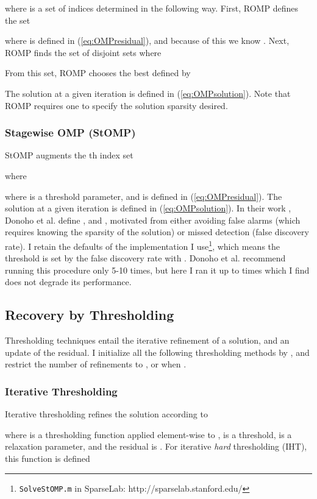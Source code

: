\documentclass[11pt,draftcls,onecolumn]{IEEEtran}
\begin{document}
where  
is a set of indices determined in the following way.
First, ROMP defines the set 

where  is defined in (\ref{eq:OMPresidual}),
and because of this we know .
Next, ROMP finds the set of  disjoint sets  where

From this set, ROMP chooses the best defined by

The solution at a given iteration is defined in (\ref{eq:OMPsolution}).
Note that ROMP requires one to specify the solution sparsity desired.

\subsubsection{Stagewise OMP (StOMP) \cite{Donoho2006}}
StOMP augments the th index set 
 
where

where  is a threshold parameter, 
and  is defined in (\ref{eq:OMPresidual}).
The solution at a given iteration is defined in (\ref{eq:OMPsolution}).
In their work \cite{Donoho2006}, Donoho et al. define , and , 
motivated from either avoiding false alarms (which requires knowing the sparsity of the solution) 
or missed detection (false discovery rate).
I retain the defaults of the implementation I use\footnote{{\tt SolveStOMP.m} 
in SparseLab: http://sparselab.stanford.edu/},
which means the threshold is set by the false discovery rate with .
Donoho et al. recommend running this procedure only 5-10 times,
but here I ran it up to  times which I find does not degrade its performance. 

\subsection{Recovery by Thresholding}
Thresholding techniques entail the iterative refinement of
a solution, and an update of the residual.
I initialize all the following thresholding methods 
by ,
and restrict the number of refinements to , 
or when .

\subsubsection{Iterative Thresholding \cite{Blumensath2009}}
Iterative thresholding refines the solution  according to

where   is a thresholding function applied element-wise to ,
 is a threshold,
 is a relaxation parameter,
and the residual is .
For iterative {\em hard} thresholding (IHT), this function is defined
\end{document}
